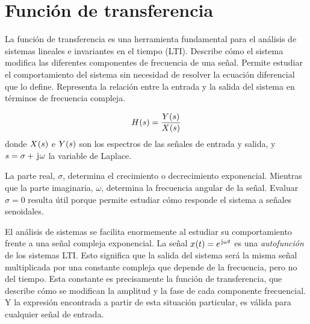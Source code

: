 \begin{mdframed}[style=DefinitionFrame]
    \begin{defn}
    \end{defn}
\end{mdframed}

\begin{mdframed}[style=DefinitionFrame]
    \begin{defn}
    \end{defn}
\end{mdframed}

\section{Función de transferencia}

La función de transferencia es una herramienta fundamental para el análisis de sistemas lineales e invariantes en el tiempo (LTI).
Describe cómo el sistema modifica las diferentes componentes de frecuencia de una señal.
Permite estudiar el comportamiento del sistema sin necesidad de resolver la ecuación diferencial que lo define.
Representa la relación entre la entrada y la salida del sistema en términos de frecuencia compleja.

\begin{mdframed}[style=DefinitionFrame]
    \begin{defn}
    \end{defn}
    \[
        \fx[H]{s} = \frac{\fx[Y]{s}}{\fx[X]{s}}
    \]
    donde $\fx[X]{s}$ e $\fx[Y]{s}$ son los espectros de las señales de entrada y salida, y $s = \sigma + \iu \omega$ la variable de Laplace.
\end{mdframed}

La parte real, $\sigma$, determina el crecimiento o decrecimiento exponencial.
Mientras que la parte imaginaria, $\omega$, determina la frecuencia angular de la señal.
Evaluar $\sigma = 0$ resulta útil porque permite estudiar cómo responde el sistema a señales senoidales.

El análisis de sistemas se facilita enormemente al estudiar su comportamiento frente a una señal compleja exponencial.
La señal $\fx[x]{t} = \complexExp$ es una \emph{autofunción} de los sistemas LTI.
Esto significa que la salida del sistema será la misma señal multiplicada por una constante compleja que depende de la frecuencia, pero no del tiempo.
Esta constante es precisamente la función de transferencia, que describe cómo se modifican la amplitud y la fase de cada componente frecuencial.
Y la expresión encontrada a partir de esta situación particular, es válida para cualquier señal de entrada.


